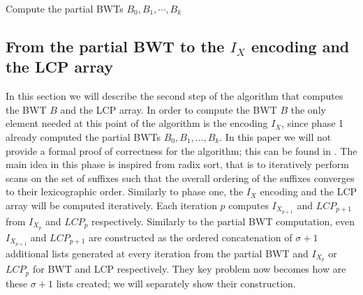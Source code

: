 \documentclass[a4paper,12pt, oneside]{article}
\begin{document}
\newpage
\begin{algorithm}[htb!]
	\caption{Compute the partial BWTs $B_0, B_1, \cdots, B_k$}
	\label{alg:sort-suffixes}
\end{algorithm}



\subsection{From the partial BWT to the $I_X$ encoding and the LCP array
\label{secondphase}}

In this section we will describe the second step of the algorithm that computes the BWT $B$ and the LCP array. In order to compute the BWT $B$ the only element needed at this point of the algorithm is the encoding $I_X$, since phase 1 already computed the partial BWTs $B_0, B_1,...,B_k$. In this paper we will not provide a formal proof of correctness for the algorithm; this can be found in \cite{paper}. The main idea in this phase is inspired from radix sort, that is to iteratively perform scans on the set of suffixes such that the overall ordering of the suffixes converges to their lexicographic order. Similarly to phase one, the $I_X$ encoding and the LCP array will be computed iteratively.
Each iteration $p$ computes $I_{X_{p+1}}$ and $LCP_{p+1}$ from $I_{X_p}$ and $LCP_p$ respectively. Similarly to the partial BWT computation, even $I_{X_{p+1}}$ and $LCP_{p+1}$ are constructed as the ordered concatenation of $\sigma + 1$ additional lists generated at every iteration from the partial BWT and $I_{X_p}$ or $LCP_p$ for BWT and LCP respectively. They key problem now becomes how are these $\sigma + 1$ lists created; we will separately show their construction.
\end{document}
